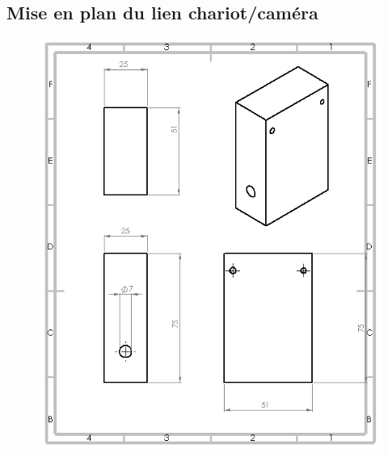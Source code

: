 \begin{changemargin}{-2cm}{-4cm}
\chapter*{Mise en plan du lien chariot/caméra}
\begin{figure}[!h]
\label{chariotcamera}
 \center
 \includegraphics[scale=0.95]{../3Dmodels/camerachariot.png}
\end{figure}


\end{changemargin}
